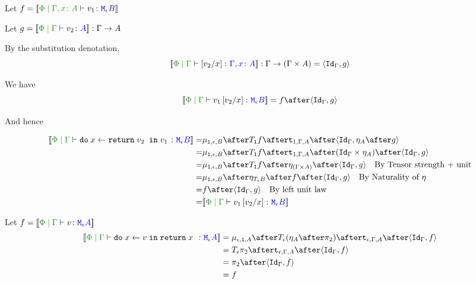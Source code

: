 {
Let $f = \deno{\etyperelation{\P}{\gax}{v_1}{\meb}}$

Let $g = \deno{\gpetyperelation{v_2}{A}}: \G \rightarrow A$

By the substitution denotation, $$\deno{\etyperelation{\P}{\G}{\ssub{x}{v_2}}{\gax}}: \G \rightarrow (\G \times A) = \pr{\idg}{g}$$

We have $$\deno{\gpetyperelation{v_1\ssub{x}{v_2}}{\meb}} = f \after \pr{\idg}{g}$$

And hence

\begin{equation}
    \begin{split}
        \deno{\gpetyperelation{\doin{x}{\return{v_2}}{v_1}}{\meb}} = &  \bind{\1}{\e}{B} \after \T{\1}{f} \after \tstrength{1}{\G}{A} \after \pr{\idg}{\point{A}\after g} \\
        = & \bind{\1}{\e}{B} \after \T{\1}{f} \after \tstrength{1}{\G}{A} \after (\idg\times \point{A}) \after \pr{\idg}{g} \\
        = & \bind{\1}{\e}{B} \after \T{\1}{f} \after \point{(\G \times A)} \after \pr{\idg}{g} \qt{By Tensor strength + unit}\\
        = & \bind{\1}{\e}{B}\after\point{\teb}\after f\after\pr{\idg}{g} \qt{By Naturality of $\point{}$}\\
        = & f\after\pr{\idg}{g} \qt{By left unit law}\\
        = & \deno{\gpetyperelation{v_1\ssub{x}{v_2}}{\meb}}\\
    \end{split}
\end{equation}





Let $f = \deno{\gpetyperelation{v}{\mea}}$ 
    \begin{equation}
    \begin{split}
        \deno{\gpetyperelation{\doin{x}{v}{\return{x}}}{\mea}}  & = \bind{\e}{\1}{A} \after \T{\e}{(\point{A} \after \pp)} \after \tstrength{\e}{\G}{A}\after \pr{\idg}{f} \\
        & = \T{\e}{\pp} \after \tstrength{\e}{\G}{A} \after \pr {\idg}{f} \\
        & = \pp \after \pr{\idg}{f}\\
        & = f
    \end{split}
\end{equation}



}
